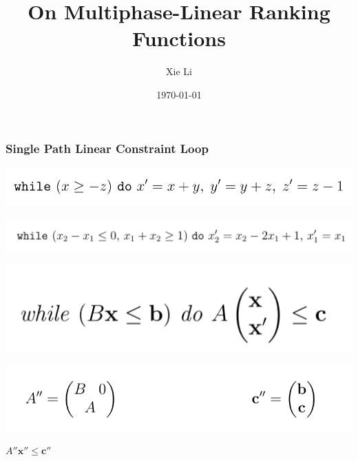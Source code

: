 \documentclass[11pt]{beamer}
\title{On Multiphase-Linear Ranking Functions}
\date{\today}
\author{Xie Li}
\begin{document}
\maketitle


\begin{frame}\frametitle{Single Path Linear Constraint Loop}
\begin{example}
\begin{center}

\includegraphics[scale = 0.4]{loopExample.png}

\includegraphics[scale = 0.4]{loopExample1.png}
\end{center}

\end{example}

\begin{definition}[SLC]
\includegraphics[scale = 0.4]{1.PNG}


\end{definition}
\begin{center}
\includegraphics[scale = 0.35]{2.PNG}

$A''\textbf{x}'' \le \textbf{c}''$
\end{center}


\end{frame}
\end{document}
